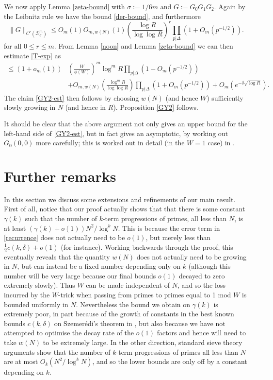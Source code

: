 \documentclass[12pt,a4paper,reqno]{amsart}
\numberwithin{equation}{section}
\theoremstyle{plain}
\theoremstyle{definition}
\renewcommand{\leq}{\leqslant}
\def\D{{\mathcal D}}
\def\w{w}
\def\vs{\vspace{11pt}}
\def\ni{\noindent}
\def\endproof{\hfill{\usebox{\proofbox}}}
\def\emph#1{{\it #1}}
\begin{document}
\ni We now apply Lemma \ref{zeta-bound} with $\sigma := 1/6m$ and
$G := G_0 G_1 G_2$.  Again by the Leibnitz rule we have the bound \eqref{der-bound}, and furthermore
\[ \| G \|_{C^r(\D^m_\sigma)} 
\leq O_m(1) O_{m,\w(N)}(1) \left( \frac{\log R}{\log \log R} \right)^r \prod_{p | \Delta} \left(1 + O_m(p^{-1/2})\right).\]
for all $0 \leq r \leq m$.  From Lemma \ref{noon} and Lemma \ref{zeta-bound}
we can then estimate \eqref{T-exp} as
\begin{align*}
 \leq (1 + o_m(1)) & \left( \frac{W}{\phi(W)} \right)^m \log^m R \prod_{p | \Delta}\left( 1 + O_m(p^{-1/2})\right) \\ & + O_{m,w(N)}\left(  \frac{\log^m R}{\log\log R} \right) \prod_{p | \Delta} \left(1 + O_m(p^{-1/2})\right) + O_m(e^{-\delta\sqrt{\log R}}).\end{align*}
The claim \eqref{GY2-est} then follows by choosing $\w(N)$ (and hence $W$)
sufficiently slowly growing in $N$ (and hence in $R$).
Proposition \ref{GY2} follows.\endproof\vspace{11pt}

\ni\emph{Remark.}  It should be clear that the above argument not only gives
an upper bound for the left-hand side of \eqref{GY2-est}, but in fact
gives an asymptotic, by working out $G_0(0,0)$ more carefully; 
this is worked out in detail (in the $W=1$ case) in \cite{goldston-yildirim}.

\section{Further remarks}

\ni In this section we discuss some extensions and refinements of our main result. First of all, notice that our proof actually shows that that there is some constant $\gamma(k)$ such that the number of $k$-term progressions of primes, all less than $N$, is at least $(\gamma(k) + o(1))N^2/\log^k N$. This is because the error term in \eqref{recurrence} does not actually need to be $o(1)$, but merely
less than $\frac{1}{2} c(k,\delta) + o(1)$ (for instance).  Working backwards through the proof, this eventually reveals that the quantity
$\w(N)$ does not actually need to be growing in $N$, but can instead be a fixed number depending only on $k$ (although this number will
be very large because our final bounds $o(1)$ decayed to zero extremely slowly).  Thus $W$ can be made independent of $N$, and so
the loss incurred by the $W$-trick when passing from primes to primes equal to 1 mod $W$ is bounded uniformly in $N$.
Nevertheless the bound we obtain on $\gamma(k)$ is extremely poor, in part because of the growth of constants in the best known
bounds $c(k,\delta)$ on Szemer\'edi's theorem in \cite{gowers}, but also because we have not attempted to optimise the decay rate of the
$o(1)$ factors and hence will need to take $\w(N)$ to be extremely large.  In the other direction, standard sieve theory arguments
show that the number of $k$-term progressions of primes all less than $N$ are at most $O_k(N^2 / \log^k N)$, and so the lower bounds are only
off by a constant depending on $k$.\vs
\end{document}
